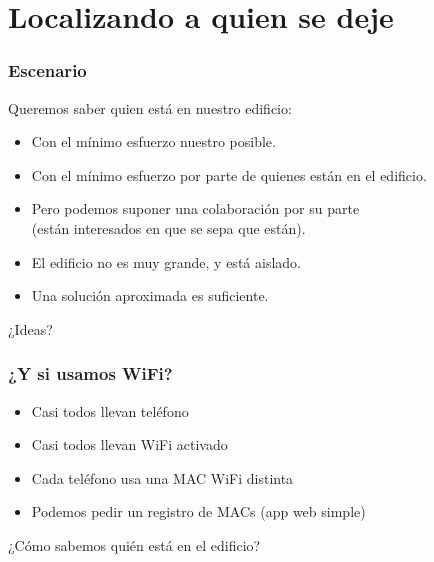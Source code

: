 %
%

\section{Localizando a quien se deje}

\begin{frame}
\frametitle{Escenario}

{\Large
Queremos saber quien está en nuestro edificio:

\begin{itemize}
  \item Con el mínimo esfuerzo nuestro posible.
  \item Con el mínimo esfuerzo por parte de quienes están en el edificio.
  \item Pero podemos suponer una colaboración por su parte \\
(están interesados en que se sepa que están).
  \item El edificio no es muy grande, y está aislado.
  \item Una solución aproximada es suficiente.
\end{itemize}
}

{\huge
\begin{center}
¿Ideas?
\end{center}
}
\end{frame}

\begin{frame}
\frametitle{¿Y si usamos WiFi?}

{\Large
\begin{itemize}
  \item Casi todos llevan teléfono
  \item Casi todos llevan WiFi activado
  \item Cada teléfono usa una MAC WiFi distinta
  \item Podemos pedir un registro de MACs (app web simple)
\end{itemize}
}

\vspace{1cm}

{\huge
\begin{center}
¿Cómo sabemos quién está en el edificio?
\end{center}
}

\end{frame}

